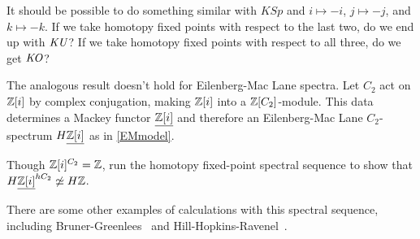 \begin{ques}
It should be possible to do something similar with $\mathit{KSp}$ and $i\mapsto -i$, $j\mapsto -j$, and $k\mapsto
-k$. If we take homotopy fixed points with respect to the last two, do we end up with $\mathit{KU}$? If we take homotopy
fixed points with respect to all three, do we get $\mathit{KO}$?
\end{ques}
\begin{ex}
The analogous result doesn't hold for Eilenberg-Mac Lane spectra. Let $C_2$ act on $\mathbb Z[i]$ by complex conjugation,
making $\mathbb Z[i]$ into a $\mathbb Z[C_2]$-module. This data determines a Mackey functor $\underline{\mathbb Z[i]}$ and therefore an
Eilenberg-Mac Lane $C_2$-spectrum $H\underline{\mathbb Z[i]}$ as in \cref{EMmodel}.

Though $\mathbb Z[i]^{C_2} = \mathbb Z$, run the homotopy fixed-point spectral sequence to show that
$H\underline{\mathbb Z[i]}^{hC_2}\not\simeq H\mathbb Z$.
\end{ex}
There are some other examples of calculations with this spectral sequence, including Bruner-Greenlees~\cite{BG10}
and Hill-Hopkins-Ravenel~\cite{HHREO2, HHR}.
